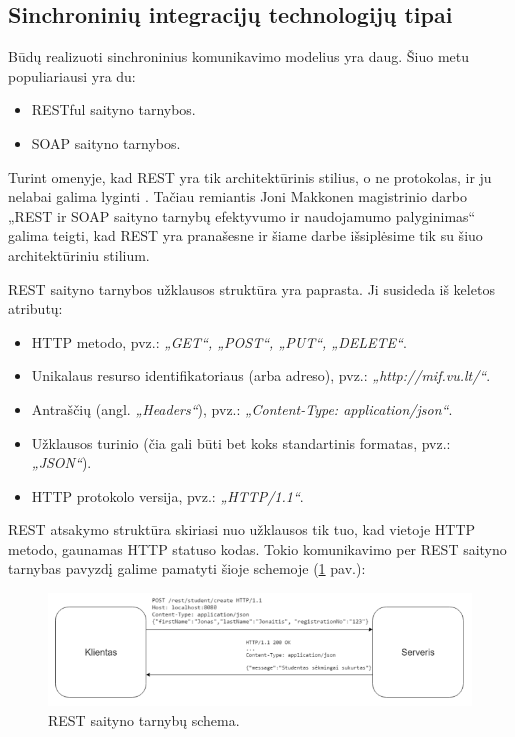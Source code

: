 \subsection{Sinchroninių integracijų technologijų tipai}
Būdų realizuoti sinchroninius komunikavimo modelius yra daug. Šiuo metu populiariausi yra du:
\begin{itemize}
	\item RESTful saityno tarnybos.
	\item SOAP saityno tarnybos.
\end{itemize}
\break

Turint omenyje, kad REST yra tik architektūrinis stilius, o ne protokolas, ir ju nelabai galima lyginti \cite{Misc5}. Tačiau
remiantis Joni Makkonen magistrinio darbo „REST ir SOAP saityno tarnybų efektyvumo ir naudojamumo palyginimas“ \cite{MstrThs2} galima teigti, kad
REST yra pranašesne ir šiame darbe išsiplėsime tik su šiuo architektūriniu stilium.
\break

REST saityno tarnybos užklausos struktūra yra paprasta. Ji susideda iš keletos atributų:
\begin{itemize}
	\item HTTP metodo, pvz.: \textit{„GET“, „POST“, „PUT“, „DELETE“}.
	\item Unikalaus resurso identifikatoriaus (arba adreso), pvz.: \textit{„http://mif.vu.lt/“}.
	\item Antraščių (angl. \textit{„Headers“}), pvz.: \textit{„Content-Type: application/json“}.
	\item Užklausos turinio (čia gali būti bet koks standartinis formatas, pvz.: \textit{„JSON“}).
	\item HTTP protokolo versija, pvz.: \textit{„HTTP/1.1“}.
\end{itemize}

REST atsakymo struktūra skiriasi nuo užklausos tik tuo, kad vietoje HTTP metodo, gaunamas HTTP statuso kodas. Tokio komunikavimo
per REST saityno tarnybas pavyzdį galime pamatyti šioje schemoje (\ref{img:Restful-scheme} pav.):

\begin{figure}[H]
  \centering
  \includegraphics[scale=0.6]{img/Restful-scheme}
  \caption{REST saityno tarnybų schema.}
  \label{img:Restful-scheme}
\end{figure}

